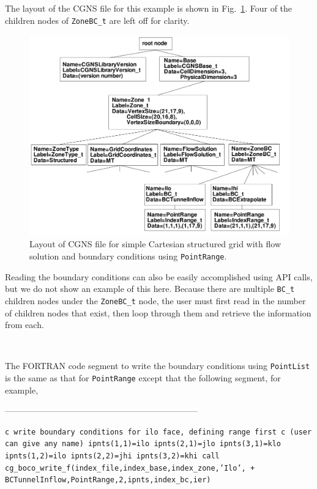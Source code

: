 \documentclass[12pt]{article}
\begin{document}
The layout of the CGNS file for this example 
is shown in Fig.~\ref{FIGtree_cartesian_BC}.
Four of the children nodes of {\tt ZoneBC\_t} are left off for
clarity.

\begin{figure}[hpbt]
\centerline{{\includegraphics[width=150mm]{figures/tree_cartesian_BC}}}
\caption{Layout of CGNS file 
for simple Cartesian structured grid with flow
solution and boundary conditions using {\tt PointRange}.}
\label{FIGtree_cartesian_BC}
\end{figure}
%

Reading the boundary conditions can also be easily accomplished using
API calls, but we do not show an example of this here.
Because there are multiple {\tt BC\_t} children nodes under the
{\tt ZoneBC\_t} node, the user must first read in the number
of children nodes 
that exist, then loop through them and retrieve the information
from each.

~

\noindent{}

The FORTRAN code segment to write the boundary conditions using
{\tt PointList} is the same as that for {\tt PointRange} except
that the following segment, for example,

--------------------------------------------------------------------

{\tt \noindent c  write boundary conditions for ilo face, defining range first
\newline c  (user can give any name)
\newline\indent      ipnts(1,1)=ilo
\newline\indent      ipnts(2,1)=jlo
\newline\indent      ipnts(3,1)=klo
\newline\indent      ipnts(1,2)=ilo
\newline\indent      ipnts(2,2)=jhi
\newline\indent      ipnts(3,2)=khi
\newline\indent      call cg\_boco\_write\_f(index\_file,index\_base,index\_zone,'Ilo',
\newline + \indent BCTunnelInflow,PointRange,2,ipnts,index\_bc,ier)}
\end{document}
